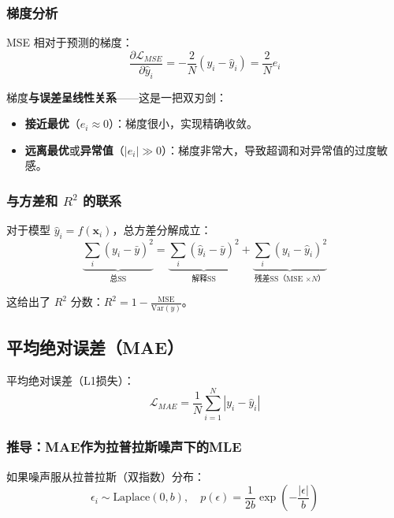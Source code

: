 \subsubsection{梯度分析}

MSE 相对于预测的梯度：
\begin{equation}
\frac{\partial \mathcal{L}_{MSE}}{\partial \hat{y}_i} = -\frac{2}{N}(y_i - \hat{y}_i) = \frac{2}{N}e_i
\end{equation}

梯度\textbf{与误差呈线性关系}——这是一把双刃剑：
\begin{itemize}
    \item \textbf{接近最优}（$e_i \approx 0$）：梯度很小，实现精确收敛。
    \item \textbf{远离最优}或\textbf{异常值}（$|e_i| \gg 0$）：梯度非常大，导致超调和对异常值的过度敏感。
\end{itemize}

\subsubsection{与方差和 \texorpdfstring{$R^2$}{R^2} 的联系}

对于模型 $\hat{y}_i = f(\mathbf{x}_i)$，总方差分解成立：
\begin{equation}
\underbrace{\sum_i (y_i - \bar{y})^2}_{\text{总SS}} = \underbrace{\sum_i (\hat{y}_i - \bar{y})^2}_{\text{解释SS}} + \underbrace{\sum_i (y_i - \hat{y}_i)^2}_{\text{残差SS（MSE $\times N$）}}
\end{equation}

这给出了 $R^2$ 分数：$R^2 = 1 - \frac{\text{MSE}}{\text{Var}(y)}$。

\subsection{平均绝对误差（MAE）}

平均绝对误差（L1损失）：
\begin{equation}
\mathcal{L}_{MAE} = \frac{1}{N}\sum_{i=1}^{N} |y_i - \hat{y}_i|
\end{equation}

\subsubsection{推导：MAE作为拉普拉斯噪声下的MLE}

如果噪声服从拉普拉斯（双指数）分布：
\begin{equation}
\epsilon_i \sim \text{Laplace}(0, b), \quad p(\epsilon) = \frac{1}{2b}\exp\left(-\frac{|\epsilon|}{b}\right)
\end{equation}

